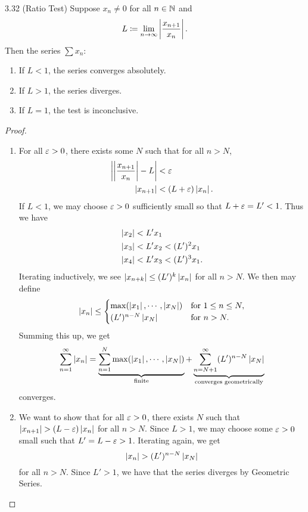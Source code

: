 \documentclass[class=article, crop=false]{standalone}
\begin{document}
  \begin{theorem}{3.32 (Ratio Test)}
    Suppose $x_n\neq 0$ for all $n\in\mathbb{N}$ and
    \[
      L\coloneqq \lim_{n\to \infty} \left\lvert \frac{x_{n+1}}{x_n} \right\rvert.
    \]
    Then the series $\sum x_n$:
    \begin{enumerate}[label=(\roman*)]
      \item If $L < 1$, the series converges absolutely.
      \item If $L > 1$, the series diverges.
      \item If $L = 1$, the test is inconclusive.
    \end{enumerate}
    \begin{proof}
      \begin{enumerate}[label=(\roman*)]
        \item For all $\varepsilon > 0$, there exists some $N$ such that for all $n > N$,
        \begin{align*}
          \left\lvert \left\lvert \frac{x_{n+1}}{x_n} \right\rvert - L \right\rvert &< \varepsilon \\
          \left\lvert x_{n + 1} \right\rvert &< (L + \varepsilon)\left\lvert x_n \right\rvert.
        \end{align*}
        If $L < 1$, we may choose $\varepsilon > 0$ sufficiently small so that $L+\varepsilon = L' < 1$. Thus we have
        \begin{align*}
          \left\lvert x_2 \right\rvert &< L'x_1 \\
          \left\lvert x_3 \right\rvert &< L'x_2 < (L')^2x_1 \\
          \left\lvert x_4 \right\rvert &< L'x_3 < (L')^3x_1.
        \end{align*}
        Iterating inductively, we see $\left\lvert x_{n + k} \right\rvert\leq (L')^k\left\lvert x_n \right\rvert$ for all $n > N$. We then may define
        \[
          \left\lvert x_n \right\rvert\leq \begin{cases}
            \max(\left\lvert x_1 \right\rvert, \dotsb, \left\lvert x_N \right\rvert) & \text{for } 1\leq n\leq N, \\
            (L')^{n - N} \left\lvert x_N \right\rvert & \text{for }n > N.
          \end{cases}
        \]
        Summing this up, we get
        \[
          \sum_{n=1}^{\infty}\left\lvert x_n \right\rvert = \underbrace{\sum_{n=1}^{N} \max(\left\lvert x_1 \right\rvert, \dotsb, \left\lvert x_N \right\rvert)}_{\text{finite}} + \underbrace{\sum_{n=N+1}^{\infty}(L')^{n - N}\left\lvert x_N \right\rvert}_{\text{converges geometrically}}
        \]
        converges.
        \item We want to show that for all $\varepsilon > 0$, there exists $N$ such that $\left\lvert x_{n + 1} \right\rvert > (L - \varepsilon)\left\lvert x_n \right\rvert$ for all $n > N$. Since $L > 1$, we may choose some $\varepsilon > 0$ small such that $L' = L - \varepsilon > 1$. Iterating again, we get
        \[
          \left\lvert x_n \right\rvert > (L')^{n - N} \left\lvert x_N \right\rvert
        \]
        for all $n > N$. Since $L' > 1$, we have that the series diverges by Geometric Series.
      \end{enumerate}
    \end{proof}
  \end{theorem}
\end{document}
